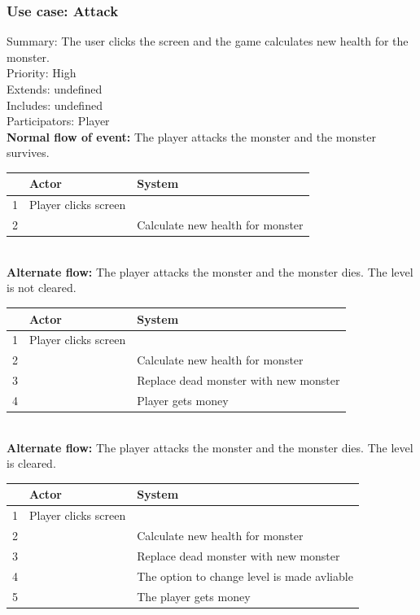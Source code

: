 \documentclass{article}
\begin{document}
\subsubsection{Use case: Attack}
Summary: The user clicks the screen and the game calculates new health for the monster.\\
Priority: High\\
Extends: undefined\\
Includes: undefined\\
Participators: Player\\
\textbf{Normal flow of event:} The player attacks the monster and the monster survives.
\vspace{1 mm}\\
\begin{tabular}{|c|l|l|} \hline
  & Actor & System \\ \hline
1 & Player clicks screen & \\ \hline
2 & & Calculate new health for monster\\ \hline
\end{tabular}\\
\newpage
\noindent
\textbf{Alternate flow:} The player attacks the monster and the monster dies. The level is not cleared.
\vspace{1 mm}\\
\begin{tabular}{|c|l|l|} \hline
    & Actor & System \\ \hline
    1 & Player clicks screen & \\ \hline
    2 & & Calculate new health for monster\\ \hline
    3 & & Replace dead monster with new monster \\ \hline
    4 & & Player gets money \\ \hline
\end{tabular}
\vspace{5 mm}\\
\textbf{Alternate flow:} The player attacks the monster and the monster dies. The level is cleared.
\vspace{1 mm}\\
\begin{tabular}{| c | l | l |} \hline
    & Actor & System \\ \hline
    1 & Player clicks screen & \\ \hline
    2 & & Calculate new health for monster\\ \hline
    3 & & Replace dead monster with new monster \\ \hline
    4 & & The option to change level is made avliable\\ \hline
    5 & & The player gets money \\ \hline
\end{tabular}
\\
\end{document}
